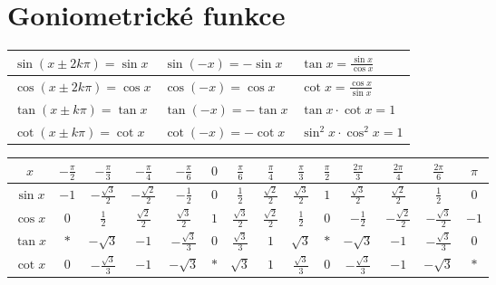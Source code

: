 \documentclass{article}
\begin{document}
	\section*{Goniometrické funkce}
	\begin{tabular}{|p{4cm}|p{4cm}|p{4cm}|}\hline
		$\sin{(x \pm 2k\pi)} = \sin{x}$				&	$\sin{(-x)} = -\sin{x}$							&	$\tan{x} = \frac{\sin{x}}{\cos{x}}$\\\hline
		$\cos{(x \pm 2k\pi)} = \cos{x}$				&	$\cos{(-x)} = \cos{x}$							&	$\cot{x} = \frac{\cos{x}}{\sin{x}}$\\\hline
		$\tan{(x \pm k\pi)} = \tan{x}$				&	$\tan{(-x)} = -\tan{x}$							&	$\tan{x} \cdot \cot{x} = 1$\\\hline
		$\cot{(x \pm k\pi)} = \cot{x}$				&	$\cot{(-x)} = -\cot{x}$							&	$\sin^{2}{x} \cdot \cos^{2}{x} = 1$\\\hline
	\end{tabular}

	\begingroup
		\centering
		\renewcommand{\arraystretch}{1.55}
		\begin{tabular}{|c|c|c|c|c|c|c|c|c|c|c|c|c|c|}\hline
			$x$	&	$-\frac{\pi}{2}$	&	$-\frac{\pi}{3}$		&	$-\frac{\pi}{4}$		&	$-\frac{\pi}{6}$		&	$0$	&	$\frac{\pi}{6}$			&	$\frac{\pi}{4}$			&	$\frac{\pi}{3}$			&	$\frac{\pi}{2}$	&	$\frac{2\pi}{3}$		&	$\frac{2\pi}{4}$		&	$\frac{2\pi}{6}$		&	$\pi$\\\hline
			$\sin{x}$	&	$-1$				&	$-\frac{\sqrt{3}}{2}$	&	$-\frac{\sqrt{2}}{2}$	&	$-\frac{1}{2}$			&	$0$	&	$\frac{1}{2}$			&	$\frac{\sqrt{2}}{2}$	&	$\frac{\sqrt{3}}{2}$	&	$1$				&	$\frac{\sqrt{3}}{2}$	&	$\frac{\sqrt{2}}{2}$	&	$\frac{1}{2}$			&	$0$\\\hline
			$\cos{x}$	&	$0$					&	$\frac{1}{2}$			&	$\frac{\sqrt{2}}{2}$	&	$\frac{\sqrt{3}}{2}$	&	$1$	&	$\frac{\sqrt{3}}{2}$	&	$\frac{\sqrt{2}}{2}$	&	$\frac{1}{2}$			&	$0$				&	$-\frac{1}{2}$			&	$-\frac{\sqrt{2}}{2}$	&	$-\frac{\sqrt{3}}{2}$	&	$-1$\\\hline
			$\tan{x}$	&	$*$					&	$-\sqrt{3}$				&	$-1$					&	$-\frac{\sqrt{3}}{3}$	&	$0$	&	$\frac{\sqrt{3}}{3}$	&	$1$						&	$\sqrt{3}$				&	$*$				&	$-\sqrt{3}$				&	$-1$					&	$-\frac{\sqrt{3}}{3}$	&	$0$\\\hline
			$\cot{x}$	&	$0$					&	$-\frac{\sqrt{3}}{3}$	&	$-1$					&	$-\sqrt{3}$				&	$*$	&	$\sqrt{3}$				&	$1$						&	$\frac{\sqrt{3}}{3}$	&	$0$				&	$-\frac{\sqrt{3}}{3}$	&	$-1$					&	$-\sqrt{3}$				&	$*$\\\hline
		\end{tabular}
	\endgroup
\end{document}

